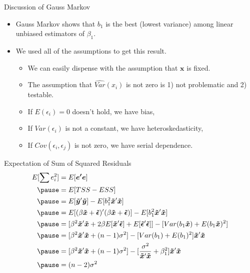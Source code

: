 \documentclass[aspectratio=169, handout]{beamer}
\numberwithin{equation}{section}
\begin{document}
\begin{frame}{Discussion of Gauss Markov}
\begin{itemize}
\item Gauss Markov shows that $b_1$ is the best (lowest variance) among linear unbiased estimators of $\beta_1$.
\item We used all of the assumptions to get this result.
\begin{itemize}
\item We can easily dispense with the assumption that $\bm{x}$ is fixed.
\item The assumption that $\widehat{Var}(x_i)$ is not zero is 1) not problematic and 2) testable.
\item If $E(\epsilon_i)=0$ doesn't hold, we have bias,
\item If $Var(\epsilon_i)$ is not a constant, we have heteroskedasticity,
\item If $Cov(\epsilon_i,\epsilon_j)$ is not zero, we have serial dependence.
\end{itemize}
\end{itemize}
\end{frame}

\begin{frame}{Expectation of Sum of Squared Residuals}
\begin{align*}
E[\sum e_i^2]&=E[\bm{e'e}]\\\pause
&=E[TSS-ESS]\\\pause
&=E[\bm{\tilde{y}}'\bm{\tilde{y}}]-E[b_1^2\bm{\tilde{x}}'\bm{\tilde{x}}]\\\pause
&=E[(\beta\bm{\tilde{x}}+\bm{\tilde{\epsilon}})'(\beta\bm{\tilde{x}}+\bm{\tilde{\epsilon}})]-E[b_1^2\bm{\tilde{x}}'\bm{\tilde{x}}]\\\pause
&=[\beta^2\bm{\tilde{x}}'\bm{\tilde{x}}+2\beta E[\bm{\tilde{x}}'\bm{\tilde{\epsilon}}]+E[\bm{\tilde{\epsilon}}'\bm{\tilde{\epsilon}}]]-[Var(b_1\bm{\tilde{x}})+E(b_1\bm{\tilde{x}})^2]\\\pause
&=[\beta^2\bm{\tilde{x}}'\bm{\tilde{x}}+(n-1)\sigma^2]-[Var(b_1)+E(b_1)^2]\bm{\tilde{x}}'\bm{\tilde{x}}\\\pause
&=[\beta^2\bm{\tilde{x}}'\bm{\tilde{x}}+(n-1)\sigma^2]-[\frac{\sigma^2}{\bm{\tilde{x}}'\bm{\tilde{x}}}+\beta_1^2]\bm{\tilde{x}}'\bm{\tilde{x}}\\\pause
&=(n-2)\sigma^2
\end{align*}
\end{frame}
\end{document}
